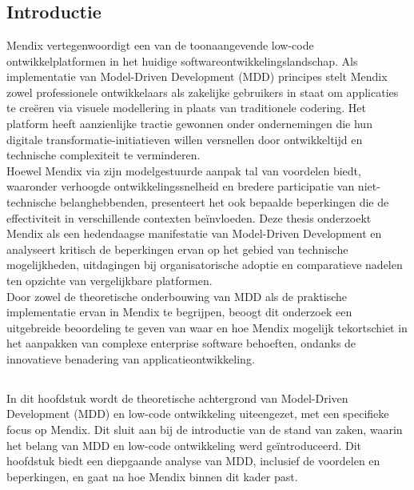 \chapter{}%
\label{ch:stand-van-zaken}

\section{Introductie}
Mendix vertegenwoordigt een van de toonaangevende low-code ontwikkelplatformen in het huidige softwareontwikkelingslandschap. Als implementatie van Model-Driven Development (MDD) principes stelt Mendix zowel professionele ontwikkelaars als zakelijke gebruikers in staat om applicaties te creëren via visuele modellering in plaats van traditionele codering. Het platform heeft aanzienlijke tractie gewonnen onder ondernemingen die hun digitale transformatie-initiatieven willen versnellen door ontwikkeltijd en technische complexiteit te verminderen.
\\
Hoewel Mendix via zijn modelgestuurde aanpak tal van voordelen biedt, waaronder verhoogde ontwikkelingssnelheid en bredere participatie van niet-technische belanghebbenden, presenteert het ook bepaalde beperkingen die de effectiviteit in verschillende contexten beïnvloeden. Deze thesis onderzoekt Mendix als een hedendaagse manifestatie van Model-Driven Development en analyseert kritisch de beperkingen ervan op het gebied van technische mogelijkheden, uitdagingen bij organisatorische adoptie en comparatieve nadelen ten opzichte van vergelijkbare platformen.
\\
Door zowel de theoretische onderbouwing van MDD als de praktische implementatie ervan in Mendix te begrijpen, beoogt dit onderzoek een uitgebreide beoordeling te geven van waar en hoe Mendix mogelijk tekortschiet in het aanpakken van complexe enterprise software behoeften, ondanks de innovatieve benadering van applicatieontwikkeling.
\newpage

\section{}%
In dit hoofdstuk wordt de theoretische achtergrond van Model-Driven Development (MDD) en low-code ontwikkeling uiteengezet, met een specifieke focus op Mendix. Dit sluit aan bij de introductie van de stand van zaken, waarin het belang van MDD en low-code ontwikkeling werd geïntroduceerd. Dit hoofdstuk biedt een diepgaande analyse van MDD, inclusief de voordelen en beperkingen, en gaat na hoe Mendix binnen dit kader past.

